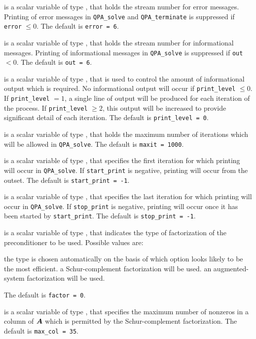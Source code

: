 \begin{description}

 is a scalar variable of type \integer, that holds the
stream number for error messages. Printing of error messages in
{\tt QPA\_solve} and {\tt QPA\_terminate}
is suppressed if {\tt error} $\leq 0$.
The default is {\tt error = 6}.

 is a scalar variable of type \integer, that holds the
stream number for informational messages. Printing of informational messages in
{\tt QPA\_solve} is suppressed if {\tt out} $< 0$.
The default is {\tt out = 6}.

 is a scalar variable of type \integer, that is used
to control the amount of informational output which is required. No
informational output will occur if {\tt print\_level} $\leq 0$. If
{\tt print\_level} $= 1$, a single line of output will be produced for each
iteration of the process. If {\tt print\_level} $\geq 2$, this output will be
increased to provide significant detail of each iteration.
The default is {\tt print\_level = 0}.

 is a scalar variable of type \integer, that holds the
maximum number of iterations which will be allowed in {\tt QPA\_solve}.
The default is {\tt maxit = 1000}.

 is a scalar variable of type \integer, that specifies
the first iteration for which printing will occur in {\tt QPA\_solve}.
If {\tt start\_print} is negative, printing will occur from the outset.
The default is {\tt start\_print = -1}.

 is a scalar variable of type \integer, that specifies
the last iteration for which printing will occur in  {\tt QPA\_solve}.
If {\tt stop\_print} is negative, printing will occur once it has been
started by {\tt start\_print}.
The default is {\tt stop\_print = -1}.

 is a scalar variable of type \integer, that indicates
the type of factorization of the preconditioner to be used.
Possible values are:

\begin{description}
 the type is chosen automatically on the basis of which option looks
        likely to be the most efficient.
 a Schur-complement factorization will be used.
 an augmented-system factorization will be used.
\end{description}
The default is {\tt factor = 0}.

 is a scalar variable of type \integer, that specifies
the maximum number of nonzeros in a column of ${\bm{A}}$ which is permitted
by the Schur-complement factorization.
The default is {\tt max\_col = 35}.


\end{description}
